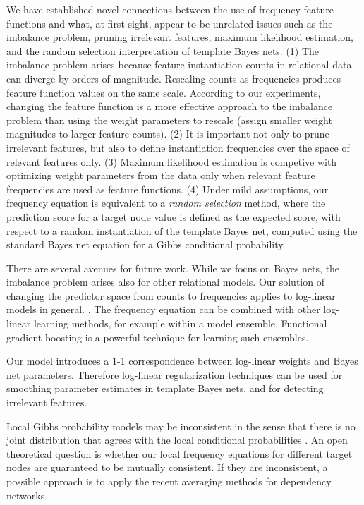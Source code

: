 \documentclass[twoside,11pt]{article}
\begin{document}
We have established novel connections between the use of frequency feature functions and what, at first sight, appear to be unrelated issues such as the imbalance problem, pruning irrelevant features, maximum likelihood estimation, and the random selection interpretation of template Bayes nets. (1) The imbalance problem arises because feature instantiation counts in relational data can diverge by orders of magnitude. Rescaling counts as frequencies produces feature function values on the same scale. According to our experiments, changing the feature function is a more effective approach to the imbalance problem than using the weight parameters to rescale (assign smaller weight magnitudes to larger feature counts). (2) It is important not only to prune irrelevant features, but also to define instantiation frequencies over the space of relevant features only. (3) Maximum likelihood estimation is competive with optimizing weight parameters from the data only when relevant feature frequencies are used as feature functions. (4) Under mild assumptions, our frequency equation is equivalent to a {\em random selection} method, where the prediction score for a target node value is defined as the expected score, with respect to a random instantiation of the template Bayes net, computed using the standard Bayes net equation for a Gibbs conditional probability.

There are several avenues for future work. While we focus on Bayes nets, the imbalance problem arises also for other relational models. Our solution of changing the predictor space from counts to frequencies applies to log-linear models in general.
\cite{Sutton2007,Taskar2002,Domingos2009}.
The frequency equation can be combined with other log-linear learning methods, for example within a model ensemble. Functional gradient boosting \cite{Khot2011} is a powerful technique for learning such ensembles. 

Our model introduces a 1-1 correspondence between log-linear weights and Bayes net parameters. Therefore log-linear regularization techniques \cite{Huynh2008} can be used for smoothing parameter estimates in template Bayes nets, and for detecting irrelevant features. 

Local Gibbs probability models  may be inconsistent in the sense that there is no joint distribution that agrees with the local conditional probabilities \cite{Heckerman2000}. An open theoretical question is whether our local frequency equations for different target nodes are guaranteed to be mutually consistent. If they are inconsistent, a possible approach is to apply the recent averaging methods for dependency networks \cite{Lowd2012,Poole2013}.
\end{document}
